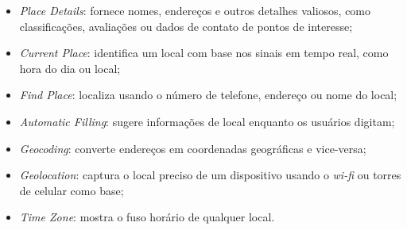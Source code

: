 \begin{itemize}
    \item \textit{Place Details}: fornece nomes, endereços e outros detalhes valiosos, como classificações, avaliações ou dados de contato de pontos de interesse;
    \item \textit{Current Place}: identifica um local com base nos sinais em tempo real, como hora do dia ou local;
    \item \textit{Find Place}: localiza usando o número de telefone, endereço ou nome do local;
    \item \textit{Automatic Filling}: sugere informações de local enquanto os usuários digitam;
    \item \textit{Geocoding}: converte endereços em coordenadas geográficas e vice-versa;
    \item \textit{Geolocation}: captura o local preciso de um dispositivo usando o \textit{wi-fi} ou torres de celular como base;
    \item \textit{Time Zone}: mostra o fuso horário de qualquer local.
\end{itemize}